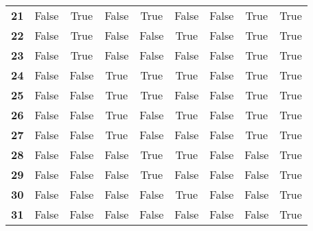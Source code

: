 \begin{tabular}{c|cccccccc}
\textbf{21} & False & True & False & True & False & False & True & True\\
\textbf{22} & False & True & False & False & True & False & True & True\\
\textbf{23} & False & True & False & False & False & False & True & True\\
\textbf{24} & False & False & True & True & True & False & True & True\\
\textbf{25} & False & False & True & True & False & False & True & True\\
\textbf{26} & False & False & True & False & True & False & True & True\\
\textbf{27} & False & False & True & False & False & False & True & True\\
\textbf{28} & False & False & False & True & True & False & False & True\\
\textbf{29} & False & False & False & True & False & False & False & True\\
\textbf{30} & False & False & False & False & True & False & False & True\\
\textbf{31} & False & False & False & False & False & False & False & True\\
\end{tabular}